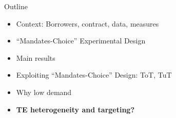 \documentclass[9pt, aspectratio=169]{beamer}
\begin{document}
\begin{frame}{Outline}
     \large   
     \begin{itemize}
        \item Context: Borrowers, contract, data, measures
         \item \vfill ``Mandates-Choice'' Experimental Design
         \vfill\item Main results
          \vfill\item Exploiting ``Mandates-Choice'' Design: ToT, TuT
         \vfill\item Why low demand
         \vfill \item \textbf{TE heterogeneity and targeting?}
     \end{itemize}
\end{frame}
\end{document}
